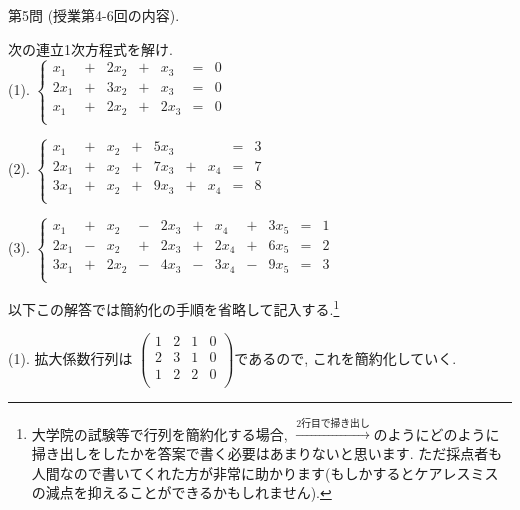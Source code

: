 \documentclass[dvipdfmx,a4paper,11pt]{article}
\theoremstyle{definition}
\begin{document}
\vspace{22pt}

 
   
{\Large 第5問} (授業第4-6回の内容).
    \vspace{11pt}

次の連立1次方程式を解け. \\

(1).
 $
 \left\{ 
\begin{matrix}
x_1& + &  2x_2&  +& x_3&  = & 0 \\
2x_1& + & 3x_2&  +& x_3&  = & 0 \\
 x_1& + & 2x_2&  +& 2x_3&  = & 0 \\
\end{matrix}
\right.
 $

(2).
 $
 \left\{ 
\begin{matrix}
x_1& + &  x_2&  +& 5x_3&  && = & 3 \\
2x_1& + &  x_2&  +& 7x_3& + &x_4& = & 7 \\
3x_1& + &  x_2&  +& 9x_3& + &x_4& = & 8 \\
\end{matrix}
\right.
 $
 
(3).
 $
 \left\{ 
\begin{array}{ccccccccccc}
x_1& +& x_2&  -&2x_3	&+&x_4& +&3x_5&=& 1\\
2x_1&-&x_2& + &2x_3&+&2x_4&+&6x_5&= &2 \\
3x_1&+&2x_2& - &4x_3& - &  3x_4  &-&9x_5&= &3\\
\end{array}
\right.
 $
 
  \vspace{11pt}
 
\hspace{-11pt}{\Large $\bullet$ 第5問解答例.}

以下この解答では簡約化の手順を省略して記入する.\footnote{大学院の試験等で行列を簡約化する場合, $\overset{\text{2行目で掃き出し}}{\longrightarrow} $のようにどのように掃き出しをしたかを答案で書く必要はあまりないと思います. ただ採点者も人間なので書いてくれた方が非常に助かります(もしかするとケアレスミスの減点を抑えることができるかもしれません).}

(1).
拡大係数行列は
$
\begin{pmatrix}
1 & 2&1&0\\
2 & 3&1&0\\
1 & 2&2&0\\
 \end{pmatrix}
 $であるので, これを簡約化していく.
 
\end{document}
